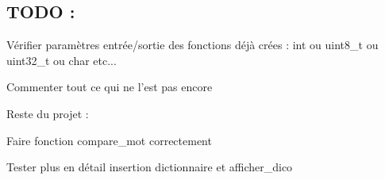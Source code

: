 \subsection*{T\-O\-D\-O \-:}


\begin{DoxyEnumerate}
\item Vérifier paramètres entrée/sortie des fonctions déjà crées \-: int ou uint8\-\_\-t ou uint32\-\_\-t ou char etc...
\item Commenter tout ce qui ne l'est pas encore
\item Reste du projet \-:
\begin{DoxyItemize}
\item Faire fonction compare\-\_\-mot correctement
\item Tester plus en détail insertion dictionnaire et afficher\-\_\-dico 
\end{DoxyItemize}
\end{DoxyEnumerate}